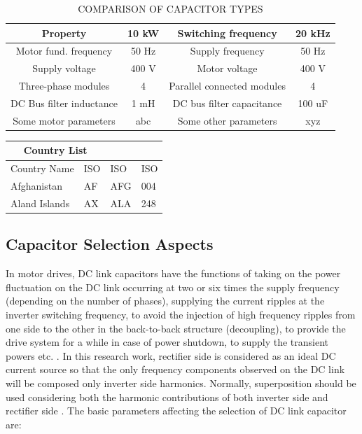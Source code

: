 \documentclass[conference,a4paper,twocolumn]{IEEEtran}
\begin{document}
\begin{table}[h]
\renewcommand{\arraystretch}{1.4}
\caption{COMPARISON OF CAPACITOR TYPES}
\label{table1}
\centering
\begin{tabular}{|c|c|c|c|}
\hline
Property & 10 kW & Switching frequency & 20 kHz\\
\hline
Motor fund. frequency & 50 Hz & Supply frequency & 50 Hz\\
\hline
Supply voltage & 400 V & Motor voltage & 400 V\\
\hline
Three-phase modules & 4 & Parallel connected modules & 4\\
\hline
DC Bus filter inductance & 1 mH & DC bus filter capacitance & 100 uF\\
\hline
Some motor parameters & abc & Some other parameters & xyz\\
\hline
\end{tabular}
\end{table}


\begin{tabular}{ |p{4cm}||p{1cm}|p{1cm}|p{1cm}|  }
 \hline
 \multicolumn{2}{|c|}{Country List} \\
 \hline
 
 Country Name    & ISO  &ISO &ISO \\
 \hline
 Afghanistan   & AF    &AFG&   004\\
 Aland Islands&   AX  & ALA   &248\\

 \hline
\end{tabular}


\subsection{Capacitor Selection Aspects}

In motor drives, DC link capacitors have the functions of taking on the power fluctuation on the DC link occurring at two or six times the supply frequency (depending on the number of phases), supplying the current ripples at the inverter switching frequency, to avoid the injection of high frequency ripples from one side to the other in the back-to-back structure (decoupling), to provide the drive system for a while in case of power shutdown, to supply the transient powers etc. \cite{Bianchi2003}. In this research work, rectifier side is considered as an ideal DC current source so that the only frequency components observed on the DC link will be composed only inverter side harmonics. Normally, superposition should be used considering both the harmonic contributions of both inverter side and rectifier side \cite{Bianchi2003}.
The basic parameters affecting the selection of DC link capacitor are:
\end{document}
